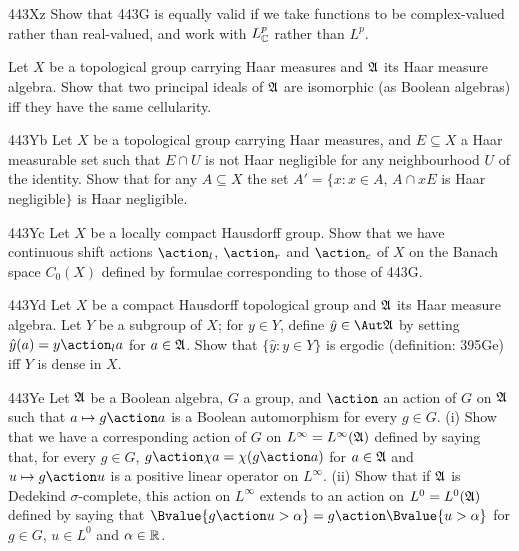 {\sqheader 443Xz Show that 443G is equally valid if we take functions to be
complex-valued rather than real-valued, and work with $L^p_{\Bbb C}$
rather than $L^p$.

Let $X$ be a topological group carrying Haar measures
and $\frak A$ its Haar measure algebra.   Show that two principal ideals
of $\frak A$ are isomorphic (as Boolean algebras) iff they have the same
cellularity.

\spheader 443Yb Let $X$ be a topological group carrying Haar measures,
and $E\subseteq X$ a Haar measurable set such that $E\cap U$ is not Haar
negligible for any neighbourhood $U$ of the identity.   Show that for
any $A\subseteq X$ the set
$A'=\{x:x\in A,\,A\cap xE$ is Haar negligible$\}$ is Haar negligible.

\spheader 443Yc Let $X$ be a locally compact Hausdorff group.   Show
that we have continuous shift
actions $\action_l$, $\action_r$ and $\action_c$
of $X$ on the Banach space $C_0(X)$ defined by formulae corresponding to
those of 443G.

\spheader 443Yd Let $X$ be a compact Hausdorff topological group and
$\frak A$ its Haar measure algebra.   Let $Y$ be a subgroup of $X$;
for $y\in Y$, define $\hat y\in\Aut\frak A$ by setting
$\hat y(a)=y\action_la$ for $a\in\frak A$.
Show that $\{\hat y:y\in Y\}$ is ergodic (definition:
395Ge) iff $Y$ is dense in $X$.

\spheader 443Ye Let $\frak A$ be a Boolean algebra, $G$ a group, and
$\action$ an action of $G$ on $\frak A$ such that $a\mapsto g\action a$ is
a Boolean automorphism for every $g\in G$.   (i) Show that we have a
corresponding action of $G$ on $L^{\infty}=L^{\infty}(\frak A)$
defined by saying that, for every $g\in G$,
$g\action\chi a=\chi(g\action a)$ for $a\in\frak A$ and
$u\mapsto g\action u$ is a positive linear operator on
$L^{\infty}$.   (ii) Show that if $\frak A$ is
Dedekind $\sigma$-complete,
this action on $L^{\infty}$ extends to an action on
$L^0=L^0(\frak A)$ defined by saying that
$\Bvalue{g\action u>\alpha}=g\action\Bvalue{u>\alpha}$ for $g\in G$,
$u\in L^0$ and $\alpha\in\Bbb R$.

}
